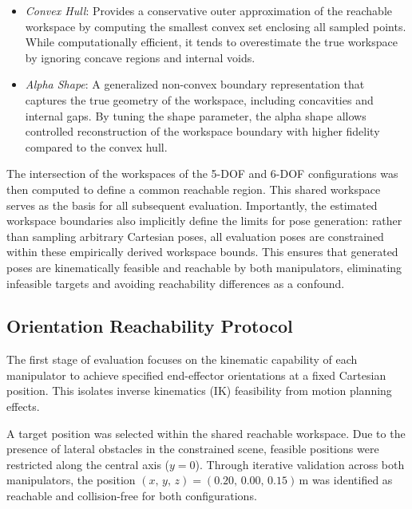 \documentclass[conference]{IEEEtran}
\begin{document}
	\begin{itemize}
		\item \textit{Convex Hull}: Provides a conservative outer
		approximation of the reachable workspace by computing the
		smallest convex set enclosing all sampled points. While
		computationally efficient, it tends to overestimate the true
		workspace by ignoring concave regions and internal voids.
		
		\item \textit{Alpha Shape}: A generalized non-convex boundary
		representation that captures the true geometry of the workspace,
		including concavities and internal gaps. By tuning the shape
		parameter, the alpha shape allows controlled reconstruction of
		the workspace boundary with higher fidelity compared to the
		convex hull.
	\end{itemize}
	
	The intersection of the workspaces of the 5-DOF and 6-DOF
	configurations was then computed to define a common reachable region.
	This shared workspace serves as the basis for all subsequent
	evaluation. Importantly, the estimated workspace boundaries also
	implicitly define the limits for pose generation: rather than sampling
	arbitrary Cartesian poses, all evaluation poses are constrained within
	these empirically derived workspace bounds. This ensures that generated
	poses are kinematically feasible and reachable by both manipulators,
	eliminating infeasible targets and avoiding reachability differences as
	a confound.
	
	\subsection{Orientation Reachability Protocol}
	
	
	The first stage of evaluation focuses on the kinematic capability of
	each manipulator to achieve specified end-effector orientations at a
	fixed Cartesian position. This isolates inverse kinematics (IK)
	feasibility from motion planning effects.
	
	A target position was selected within the shared reachable workspace.
	Due to the presence of lateral obstacles in the constrained scene,
	feasible positions were restricted along the central axis ($y = 0$).
	Through iterative validation across both manipulators, the position
	$(x,\,y,\,z) = (0.20,\,0.00,\,0.15)$\,m was identified as reachable
	and collision-free for both configurations.
	
\end{document}
